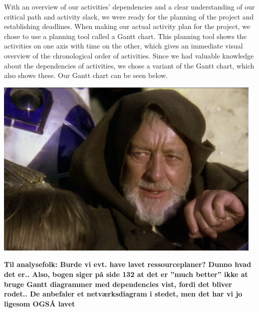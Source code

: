 With an overview of our activities’ dependencies and a clear understanding of our critical path and activity slack, we were ready for the planning of the project and establishing deadlines. 
When making our actual activity plan for the project, we chose to use a planning tool called a Gantt chart. This planning tool shows the activities on one axis with time on the other, which gives an immediate visual overview of the chronological order of activities. Since we had valuable knowledge about the dependencies of activities, we chose a variant of the Gantt chart, which also shows these.
Our Gantt chart can be seen below.  

\includegraphics[scale=0.5]{./Empiri/Planning/img/notyetmade.png}

\textbf{Til analysefolk: 
Burde vi evt. have lavet ressourceplaner? Dunno hvad det er..
Also, bogen siger på side 132 at det er ”much better” ikke at bruge Gantt diagrammer med dependencies vist, fordi det bliver rodet.. De anbefaler et netværksdiagram i stedet, men det har vi jo ligesom OGSÅ lavet}
